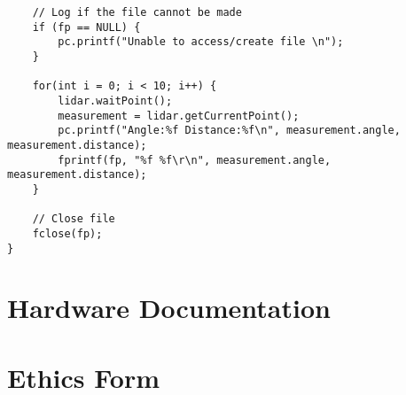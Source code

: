 \begin{appendices}
\begin{lstlisting}
	// Log if the file cannot be made
	if (fp == NULL) {
		pc.printf("Unable to access/create file \n");
	}

	for(int i = 0; i < 10; i++) {
		lidar.waitPoint();
		measurement = lidar.getCurrentPoint();
		pc.printf("Angle:%f Distance:%f\n", measurement.angle, measurement.distance);
		fprintf(fp, "%f %f\r\n", measurement.angle, measurement.distance);
	}
					
	// Close file
	fclose(fp);
}
			\end{lstlisting}
	
	\chapter{Hardware Documentation}
	
	\chapter{Ethics Form}
	
	\end{appendices}
			
